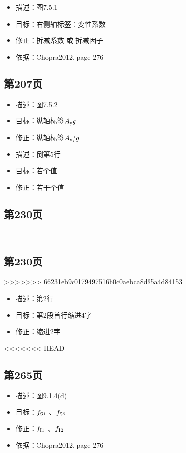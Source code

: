 \documentclass[11pt]{article}
\begin{document}
\begin{itemize}
\item 描述：图7.5.1
\item 目标：右侧轴标签：变性系数
\item 修正：折减系数 或 折减因子
\item 依据：Chopra2012, page 276
\end{itemize}

\subsection*{第207页}
\label{sec:org62d3dbd}

\begin{itemize}
\item 描述：图7.5.2
\item 目标：纵轴标签\(A_{\mathrm{y}} g\)
\item 修正：纵轴标签\(A_{\mathrm{y}} /g\)

\item 描述：倒第5行
\item 目标：若个值
\item 修正：若干个值
\end{itemize}

\subsection*{第230页}
\label{sec:orgd85c7a9}
=======
\subsection*{第230页}
\label{sec:org949a80f}
>>>>>>> 66231eb9c0179497516b0c0aebca8d85a4d84153

\begin{itemize}
\item 描述：第2行
\item 目标：第2段首行缩进4字
\item 修正：缩进2字
\end{itemize}

<<<<<<< HEAD
\subsection*{第265页}
\label{sec:org6f07b3b}

\begin{itemize}
\item 描述：图9.1.4(d)
\item 目标：\(f_{\mathrm{S}1}\) 、\(f_{\mathrm{S}2}\)
\item 修正：\(f_{\mathrm{I}1}\) 、\(f_{\mathrm{I}2}\)
\item 依据：Chopra2012, page 276
\end{itemize}
\end{document}
